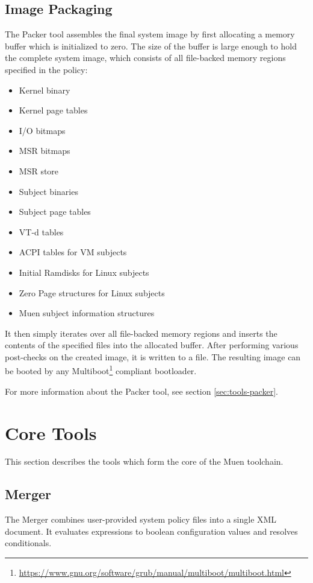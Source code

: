 \documentclass[a4paper,twoside,titlepage]{article}
\begin{document}
\subsection{Image Packaging}
The Packer tool assembles the final system image by first allocating a memory
buffer which is initialized to zero. The size of the buffer is large enough to
hold the complete system image, which consists of all file-backed memory
regions specified in the policy:

\begin{itemize}
	\item Kernel binary
	\item Kernel page tables
	\item I/O bitmaps
	\item MSR bitmaps
	\item MSR store
	\item Subject binaries
	\item Subject page tables
	\item VT-d tables
	\item ACPI tables for VM subjects
	\item Initial Ramdisks for Linux subjects
	\item Zero Page structures for Linux subjects
	\item Muen subject information structures
\end{itemize}

It then simply iterates over all file-backed memory regions and inserts the
contents of the specified files into the allocated buffer. After performing
various post-checks on the created image, it is written to a file. The
resulting image can be booted by any
Multiboot\footnote{\url{https://www.gnu.org/software/grub/manual/multiboot/multiboot.html}}
compliant bootloader.

For more information about the Packer tool, see section \ref{sec:tools-packer}.

\section{Core Tools}
\label{sec:tools}

This section describes the tools which form the core of the Muen toolchain.

\subsection{Merger}
\label{sec:tools-merger}
The Merger combines user-provided system policy files into a single XML
document. It evaluates expressions to boolean configuration values and resolves
conditionals.
\end{document}
